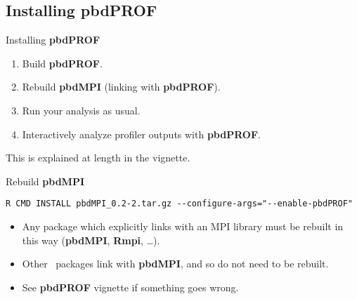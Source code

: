 \subsection{Installing pbdPROF}
\makesubcontentsslidessec


\begin{frame}
  \begin{block}{Installing \textbf{pbdPROF}}
    \begin{enumerate}
      \item Build \textbf{pbdPROF}.
      \item Rebuild \textbf{pbdMPI} (linking with \textbf{pbdPROF}).
      \item Run your analysis as usual.
      \item Interactively analyze profiler outputs with \textbf{pbdPROF}.
    \end{enumerate}
    This is explained at length in the  vignette.
  \end{block}
\end{frame}



\begin{frame}[fragile]
  \begin{block}{Rebuild \textbf{pbdMPI}}
\begin{lstlisting}[language=shl]
R CMD INSTALL pbdMPI_0.2-2.tar.gz --configure-args="--enable-pbdPROF"
\end{lstlisting}
    \begin{itemize}
      \item Any package which explicitly links with an MPI library must be 
rebuilt in this way 
(\textbf{pbdMPI}, \textbf{Rmpi}, \dots).
          \item Other \pbdR\ packages link with \textbf{pbdMPI}, and so do not 
need to be rebuilt.
      \item See \textbf{pbdPROF} vignette if something goes wrong.
    \end{itemize}
  \end{block}
\end{frame}

